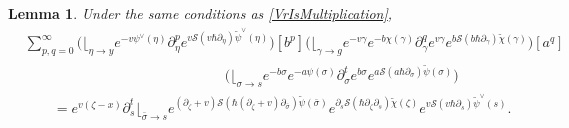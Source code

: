 \documentclass[10pt,a4paper,oneside,no-math,reqno]{amsart}%
\theoremstyle{plain}
\newtheorem{lemma}[theorem]{Lemma}
\theoremstyle{definition}
\theoremstyle{remark}
\numberwithin{equation}{section}
\newcommand{\mc}[1]{\mathcal{#1}}
\newcommand{\1}{\mathds{1}}
\newcommand{\<}{\langle}
\renewcommand{\>}{\rangle}
\newcommand{\del}{\partial}
\begin{document}
\begin{lemma}\label{SubstitutionOfDerivatives}
	Under the same conditions as \cref{VrIsMultiplication},
	\begin{equation}
		\begin{split}
			&\sum_{p,q=0}^\infty 
			\bigg(  \Big\lfloor_{\eta \to y} e^{-v \psi^\vee (\eta)} \del_\eta^p  e^{v \mc{S}(v \hbar \del_{\eta}) \tilde{\psi}^\vee (\eta)}\bigg)
			[b^p ]
			\bigg( \Big\lfloor_{\gamma \to g} e^{-v \gamma} e^{-b \chi (\gamma)} \del_\gamma^q e^{v \gamma} e^{b \mc{S}(b \hbar \del_\gamma) \tilde{\chi} (\gamma) } \bigg) [a^q]
			\\
			&\hspace{6cm}
			\bigg(  \Big\lfloor_{\sigma \to s} e^{-b \sigma} e^{-a \psi (\sigma)} \del_\sigma^t e^{b \sigma} e^{a \mc{S}(a \hbar \del_\sigma)\tilde{\psi} (\sigma) } \bigg)
			\\
			&\qquad=
			e^{v (\zeta - x)}
			\del_s^t \Big\lfloor_{\bar{\sigma} \to s}
			e^{ (\del_\zeta+v) \mc{S}( \hbar (\del_\zeta + v) \del_{\bar{\sigma}} )\tilde{\psi} (\bar{\sigma}) }
			e^{ \del_s \mc{S}( \hbar \del_\zeta \del_s ) \tilde{\chi} (\zeta ) }
			e^{v \mc{S}(v \hbar \del_s) \tilde{\psi}^\vee (s)}.
		\end{split}
	\end{equation}
\end{lemma}
\end{document}
